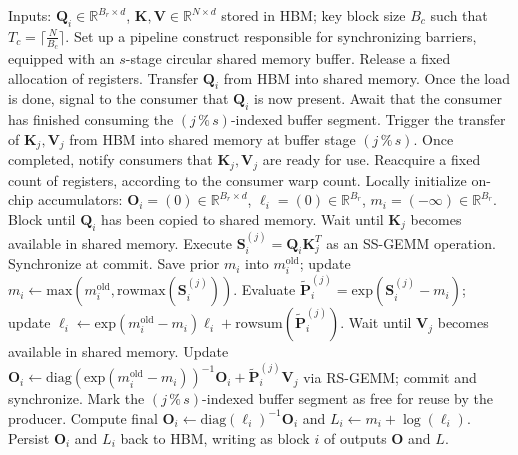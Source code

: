 \begin{algorithm}[H]
    \caption{\small\label{alg:flash3_wgmma_ws_only}\textsc{FlashAttention-3} forward execution \textbf{absent} intra-consumer overlap -- CTA arrangement}
    \begin{algorithmic}[1]
\REQUIRE Inputs: $\mathbf{Q}_i \in \mathbb{R}^{B_r \times d}$, $\mathbf{K}, \mathbf{V} \in \mathbb{R}^{N \times d}$ stored in HBM; key block size $B_c$ such that $T_c = \lceil \frac{N}{B_c} \rceil$.
\STATE Set up a pipeline construct responsible for synchronizing barriers, equipped with an $s$-stage circular shared memory buffer.
\STATE Release a fixed allocation of registers.
\STATE Transfer $\mathbf{Q}_i$ from HBM into shared memory.
\STATE Once the load is done, signal to the consumer that $\mathbf{Q}_i$ is now present.
    \STATE Await that the consumer has finished consuming the $(j\,\%\,s)$-indexed buffer segment.
    \STATE Trigger the transfer of $\mathbf{K}_j, \mathbf{V}_j$ from HBM into shared memory at buffer stage $(j\,\%\,s)$.
    \STATE Once completed, notify consumers that $\mathbf{K}_j, \mathbf{V}_j$ are ready for use.
\ENDFOR
\ELSE \STATE Reacquire a fixed count of registers, according to the consumer warp count.
\STATE Locally initialize on-chip accumulators: $\mathbf{O}_i = (0) \in \mathbb{R}^{B_r \times d}$, $\ell_i = (0) \in \mathbb{R}^{B_r}$, $m_i = (-\infty) \in \mathbb{R}^{B_r}$.
\STATE Block until $\mathbf{Q}_i$ has been copied to shared memory.
\STATE Wait until $\mathbf{K}_j$ becomes available in shared memory.
\STATE Execute $\mathbf{S}_i^{(j)} = \mathbf{Q}_i \mathbf{K}_j^T$ as an SS-GEMM operation. Synchronize at commit. \label{alg:ws_only_gemm1}
\STATE Save prior $m_i$ into $m_i^{\mathrm{old}}$; update $m_i \gets \mathrm{max}(m_i^{\mathrm{old}}, \mathrm{rowmax}(\mathbf{S}_i^{(j)}))$. \label{code-ws:softmax_start}
\STATE Evaluate $\widetilde{\mathbf{P}}_i^{(j)} = \mathrm{exp}(\mathbf{S}_i^{(j)} - m_i)$; update $\ell_i \gets \mathrm{exp}(m_i^{\mathrm{old}} - m_i) \ell_i + \mathrm{rowsum}(\widetilde{\mathbf{P}}_i^{(j)})$. \label{code-ws:softmax_end}
\STATE Wait until $\mathbf{V}_j$ becomes available in shared memory.
\STATE Update $\mathbf{O}_i \gets \mathrm{diag}(\mathrm{exp}(m_i^{\mathrm{old}} - m_i))^{-1} \mathbf{O}_i + \widetilde{\mathbf{P}}_i^{(j)} \mathbf{V}_j$ via RS-GEMM; commit and synchronize. \label{alg:ws_only_gemm2}
\STATE Mark the $(j\,\%\,s)$-indexed buffer segment as free for reuse by the producer.
\ENDFOR
\STATE Compute final $\mathbf{O}_i \gets \mathrm{diag}(\ell_i)^{-1} \mathbf{O}_i$ and $L_i \gets m_i + \log(\ell_i)$.
\STATE Persist $\mathbf{O}_i$ and $L_i$ back to HBM, writing as block $i$ of outputs $\mathbf{O}$ and $L$.
\ENDIF
\end{algorithmic}
\end{algorithm}


